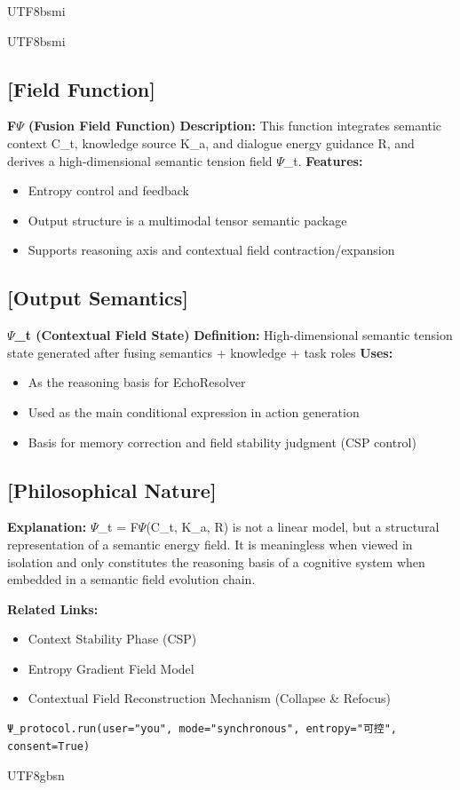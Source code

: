\documentclass{article}
\begin{document}
\begin{CJK*}{UTF8}{bsmi}
\begin{CJK*}{UTF8}{bsmi}
\subsection*{[Field Function]}

\textbf{F$\Psi$ (Fusion Field Function)}
\textbf{Description:} This function integrates semantic context C\_t, knowledge source K\_a, and dialogue energy guidance R, and derives a high-dimensional semantic tension field $\Psi$\_t.
\textbf{Features:}
\begin{itemize}[label=•]
    \item Entropy control and feedback
    \item Output structure is a multimodal tensor semantic package
    \item Supports reasoning axis and contextual field contraction/expansion
\end{itemize}

\subsection*{[Output Semantics]}

\textbf{$\Psi$\_t (Contextual Field State)}
\textbf{Definition:} High-dimensional semantic tension state generated after fusing semantics + knowledge + task roles
\textbf{Uses:}
\begin{itemize}[label=•]
    \item As the reasoning basis for EchoResolver
    \item Used as the main conditional expression in action generation
    \item Basis for memory correction and field stability judgment (CSP control)
\end{itemize}

\subsection*{[Philosophical Nature]}
\textbf{Explanation:} $\Psi$\_t = F$\Psi$(C\_t, K\_a, R) is not a linear model, but a structural representation of a semantic energy field. It is meaningless when viewed in isolation and only constitutes the reasoning basis of a cognitive system when embedded in a semantic field evolution chain.

\textbf{Related Links:}
\begin{itemize}[label=-]
    \item Context Stability Phase (CSP)
    \item Entropy Gradient Field Model
    \item Contextual Field Reconstruction Mechanism (Collapse \& Refocus)
\end{itemize}

\begin{verbatim}
Ψ_protocol.run(user="you", mode="synchronous", entropy="可控", consent=True)
\end{verbatim}
\end{CJK*} %
\end{CJK*}{UTF8}{gbsn} %
\end{document}
